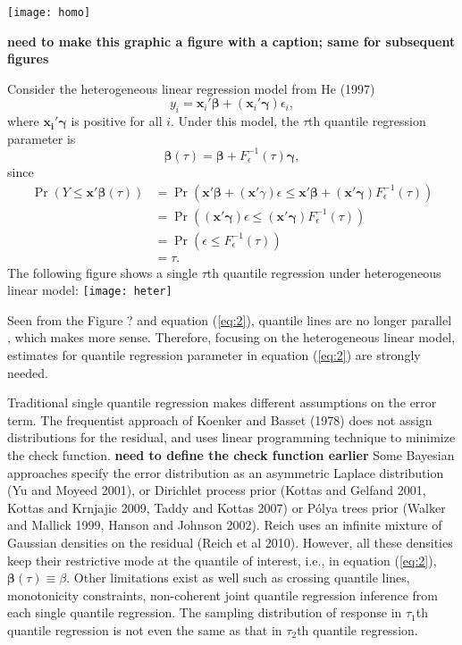 \documentclass[12pt]{article}
\newcommand{\polya}{P\'{o}lya}
\DeclareMathOperator{\pr}{Pr}
\begin{document}
\texttt{[image: homo]}

{\bf need to make this graphic a figure with a caption; same for
  subsequent figures}

Consider the heterogeneous linear regression model  from He (1997) 
\begin{displaymath}
y_i = \bm{x}_i'\bm{\beta} + (\bm{x}_i'\bm{\gamma}) \epsilon_i, 
\end{displaymath}
where $\bm{x_i'\gamma}$ is positive  for all
$i$. Under this model, the $\tau$th quantile regression parameter is 
\begin{equation}\label{eq:2}
\bm{\beta}(\tau) = \bm{\beta} + F^{-1}_{\epsilon}(\tau) \bm{\gamma},
\end{equation}
since 
\begin{align*}
\pr (Y \le \bm{x'\beta}(\tau)) & = \pr \left( \bm{x'\beta} +
  (\bm{x}'\gamma) \epsilon \le \bm{x'\beta} + (\bm{x'\gamma})
  F^{-1}_{\epsilon}(\tau) \right) \\
& = \pr \left( (\bm{x'\gamma}) \epsilon \le  (\bm{x'\gamma})
  F^{-1}_{\epsilon}(\tau)  \right)\\
& = \pr (\epsilon \le F^{-1}_{\epsilon}(\tau)) \\
& = \tau .
\end{align*}
The following figure shows a single $\tau$th quantile regression under
heterogeneous linear model:
\texttt{[image: heter]}

Seen from the Figure ? and equation (\ref{eq:2}), quantile lines
are no longer parallel , which makes more sense. Therefore, focusing on the heterogeneous linear model, estimates
for quantile regression parameter in equation (\ref{eq:2}) are strongly
needed. 

Traditional single quantile regression makes different assumptions on
the error term. The frequentist approach of  Koenker and Basset (1978) does not
assign distributions for the residual, and uses linear
programming technique to minimize the check function. {\bf need to
  define the check function earlier} Some Bayesian
approaches specify the error distribution as an asymmetric Laplace
distribution (Yu and Moyeed 2001), or Dirichlet process prior (Kottas
and Gelfand 2001, Kottas and Krnjajic 2009, Taddy and Kottas 2007) or
\polya{} trees prior (Walker and Mallick 1999, Hanson and Johnson
2002). Reich uses an infinite mixture of Gaussian densities on the
residual (Reich et al 2010). However, all these densities keep their
restrictive mode at the quantile of interest, i.e., in equation
(\ref{eq:2}), $\bm{\beta}(\tau) \equiv \beta$. Other limitations exist
as well such as crossing quantile lines, monotonicity constraints,
non-coherent joint quantile regression inference from each single
quantile regression. The sampling distribution of response in
$\tau_1$th quantile regression is not even the same as that in
$\tau_2$th quantile regression.
\end{document}
